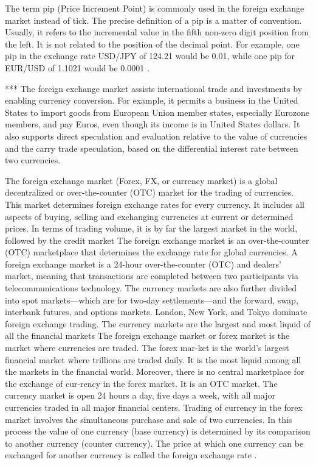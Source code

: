 The term pip (Price Increment Point) is commonly used in the foreign exchange
market instead of tick. The precise definition of a pip is a matter of
convention. Usually, it refers to the incremental value in the fifth non-zero
digit position from the left. It is not related to the position of the decimal
point. For example, one pip in the exchange rate USD/JPY of 124.21 would be
0.01, while one pip for EUR/USD of 1.1021 would be 0.0001
\cite{forex_market_micro,forex_structure,order_flow_forex,micro_eff}.

***
The foreign exchange market assists international trade and investments by enabling currency conversion. For example, it permits a business in the United States to import goods from European Union member states, especially Eurozone members, and pay Euros, even though its income is in United States dollars. It also supports direct speculation and evaluation relative to the value of currencies and the carry trade speculation, based on the differential interest rate between two currencies.

The foreign exchange market (Forex, FX, or currency market) is a global decentralized or over-the-counter (OTC) market for the trading of currencies. This market determines foreign exchange rates for every currency. It includes all aspects of buying, selling and exchanging currencies at current or determined prices. In terms of trading volume, it is by far the largest market in the world, followed by the credit market
The foreign exchange market is an over-the-counter (OTC) marketplace that determines the exchange rate for global currencies.
A foreign exchange market is a 24-hour over-the-counter (OTC) and dealers’ market, meaning that transactions are completed between two participants via telecommunications technology. The currency markets are also further divided into spot markets—which are for two-day settlements—and the forward, swap, interbank futures, and options markets. London, New York, and Tokyo dominate foreign exchange trading. The currency markets are the largest and most liquid of all the financial markets
The foreign exchange market or forex market is the market where currencies are traded. The forex mar-ket is the world’s largest financial market where trillions are traded daily. It is the most liquid among all the markets in the financial world. Moreover, there is no central marketplace for the exchange of cur-rency in the forex market. It is an OTC market. The currency market is open 24 hours a day, five days a week, with all major currencies traded in all major financial centers. Trading of currency in the forex market involves the simultaneous purchase and sale of two currencies. In this process the value of one currency (base currency) is determined by its comparison to another currency (counter currency). The price at which one currency can be exchanged for another currency is called the foreign exchange rate \cite{book_forex,book_forex_2}.

